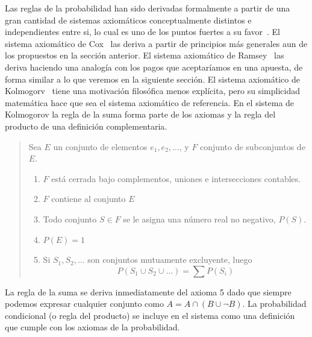 \documentclass[a4paper,10pt]{book}
\theoremstyle{definition}
\begin{document}
Las reglas de la probabilidad han sido derivadas formalmente a partir de una gran cantidad de sistemas axiom\'aticos conceptualmente distintos e independientes entre si, lo cual es uno de los puntos fuertes a su favor~\cite{halpern2017}.
%
El sistema axiom\'atico de Cox~\cite{cox} las deriva a partir de principios m\'as generales aun de los propuestos en la secci\'on anterior.
%
El sistema axiom\'atico de Ramsey~\cite{ramsey} las deriva haciendo una analog\'ia con los pagos que aceptar\'iamos en una apuesta, de forma similar a lo que veremos en la siguiente secci\'on. 
%
El sistema axiom\'atico de Kolmogorv~\cite{kolmogorov} tiene una motivaci\'on filos\'ofica menos expl\'icita, pero su simplicidad matem\'atica hace que sea el sistema axiom\'atico de referencia.
%
En el sistema de Kolmogorov la regla de la suma forma parte de los axiomas y la regla del producto de una definici\'on complementaria.
%
\begin{quotation}
Sea $E$ un conjunto de elementos $e_1, e_2, \dots$, y $F$ conjunto de subconjuntos de $E$.
%
\begin{enumerate}\itemsep-0.05cm
\item $F$ est\'a cerrada bajo complementos, uniones e intersecciones contables.
\item $F$ contiene al conjunto $E$
\item Todo conjunto $S \in F$ se le asigna una número real no negativo, $P(S)$.
\item $P(E) = 1$
\item Si $S_1, S_2, \dots$ son conjuntos mutuamente excluyente, luego
\begin{equation}
P(S_1 \cup S_2 \cup \dots ) = \sum P(S_i)
\end{equation}
\end{enumerate}
\end{quotation}
%
La regla de la suma se deriva inmediatamente del axioma 5 dado que siempre podemos expresar cualquier conjunto como $A = A \cap (B \cup \neg B)$.
%
La probabilidad condicional (o regla del producto) se incluye en el sistema como una definici\'on que cumple con los axiomas de la probabilidad. 

\end{document}

